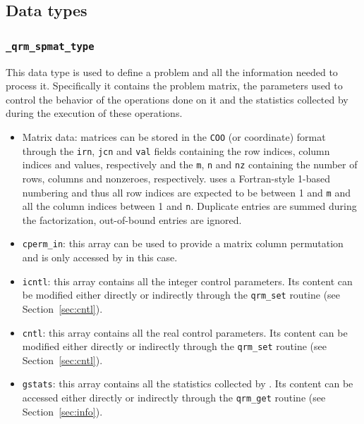 \documentclass[11pt]{article}
\begin{document}

\subsection{Data types}
\subsubsection{\texttt{\_qrm\_spmat\_type}}
This data type is used to define a problem and all the information
needed to process it. Specifically it contains the problem matrix, the
parameters used to control the behavior of the \qrm operations done on
it and the statistics collected by \qrm during the execution of these
operations.


\begin{itemize}
\item Matrix data: matrices can be stored in the \texttt{COO} (or
  coordinate) format through the \texttt{irn}, \texttt{jcn} and
  \texttt{val} fields containing the row indices, column indices and
  values, respectively and the \texttt{m}, \texttt{n} and \texttt{nz}
  containing the number of rows, columns and nonzeroes,
  respectively. \qrm uses a Fortran-style 1-based numbering and thus
  all row indices are expected to be between 1 and \texttt{m} and all
  the column indices between 1 and \texttt{n}. Duplicate entries are
  summed during the factorization, out-of-bound entries are ignored.
\item \texttt{cperm\_in}: this array can be used to provide a matrix
  column permutation and is only accessed by \qrm in this case.
\item \texttt{icntl}: this array contains all the integer control
  parameters. Its content can be modified either directly or
  indirectly through the \texttt{qrm\_set} routine (see
  Section~\ref{sec:cntl}).
\item \texttt{cntl}: this array contains all the real control
  parameters. Its content can be modified either directly or
  indirectly through the \texttt{qrm\_set} routine (see
  Section~\ref{sec:cntl}).
\item \texttt{gstats}: this array contains all the statistics
  collected by \qrm. Its content can be accessed either directly or
  indirectly through the \texttt{qrm\_get} routine (see
  Section~\ref{sec:info}).
\end{itemize}
\end{document}
